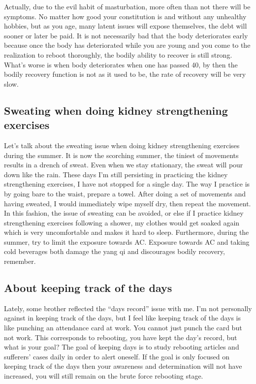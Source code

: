 \documentclass[
]{book}
\begin{document}
Actually, due to the evil habit of masturbation, more often than not there will be symptoms. No matter how good your constitution is and without any unhealthy hobbies, but as you age, many latent issues will expose themselves, the debt will sooner or later be paid. It is not necessarily bad that the body deteriorates early because once the body has deteriorated while you are young and you come to the realization to reboot thoroughly, the bodily ability to recover is still strong. What's worse is when body deteriorates when one has passed 40, by then the bodily recovery function is not as it used to be, the rate of recovery will be very slow.

\hypertarget{sweating-when-doing-kidney-strengthening-exercises}{%
\subsection{Sweating when doing kidney strengthening exercises}\label{sweating-when-doing-kidney-strengthening-exercises}}

Let's talk about the sweating issue when doing kidney strengthening exercises during the summer. It is now the scorching summer, the tiniest of movements results in a drench of sweat. Even when we stay stationary, the sweat will pour down like the rain. These days I'm still persisting in practicing the kidney strengthening exercises, I have not stopped for a single day. The way I practice is by going bare to the waist, prepare a towel. After doing a set of movements and having sweated, I would immediately wipe myself dry, then repeat the movement. In this fashion, the issue of sweating can be avoided, or else if I practice kidney strengthening exercises following a shower, my clothes would get soaked again which is very uncomfortable and makes it hard to sleep. Furthermore, during the summer, try to limit the exposure towards AC. Exposure towards AC and taking cold beverages both damage the yang qi and discourages bodily recovery, remember.

\hypertarget{about-keeping-track-of-the-days}{%
\subsection{About keeping track of the days}\label{about-keeping-track-of-the-days}}

Lately, some brother reflected the ``days record'' issue with me. I'm not personally against in keeping track of the days, but I feel like keeping track of the days is like punching an attendance card at work. You cannot just punch the card but not work. This corresponds to rebooting, you have kept the day's record, but what is your goal? The goal of keeping days is to study rebooting articles and sufferers' cases daily in order to alert oneself. If the goal is only focused on keeping track of the days then your awareness and determination will not have increased, you will still remain on the brute force rebooting stage.
\end{document}
